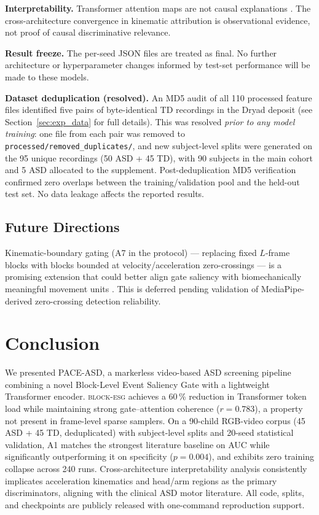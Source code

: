\documentclass[a4paper,fleqn]{cas-sc}
\newcommand{\besg}{\textsc{block-esg}\xspace}
\begin{document}
\textbf{Interpretability.}
Transformer attention maps are not causal explanations \citep{jain2019attention}.
The cross-architecture convergence in kinematic attribution is observational
evidence, not proof of causal discriminative relevance.

\textbf{Result freeze.}
The per-seed JSON files are treated as final.
No further architecture or hyperparameter changes informed by test-set
performance will be made to these models.

\textbf{Dataset deduplication (resolved).}
\label{sec:integrity}
An MD5 audit of all 110 processed feature files identified five pairs of
byte-identical TD recordings in the Dryad deposit
(see Section~\ref{sec:exp_data} for full details).
This was resolved \textit{prior to any model training}: one file from each pair
was removed to \texttt{processed/removed\_duplicates/}, and new subject-level
splits were generated on the 95 unique recordings (50 ASD + 45 TD),
with 90 subjects in the main cohort and 5 ASD allocated to the supplement.
Post-deduplication MD5 verification confirmed zero overlaps between
the training/validation pool and the held-out test set.
No data leakage affects the reported results.


\subsection{Future Directions}

Kinematic-boundary gating (A7 in the protocol) --- replacing fixed $L$-frame
blocks with blocks bounded at velocity/acceleration zero-crossings --- is a
promising extension that could better align gate saliency with biomechanically
meaningful movement units \citep{bhat2012perspectives}.
This is deferred pending validation of MediaPipe-derived zero-crossing detection
reliability.

\section{Conclusion}
\label{sec:conc}

We presented PACE-ASD, a markerless video-based ASD screening pipeline
combining a novel Block-Level Event Saliency Gate with a lightweight Transformer
encoder.
\besg achieves a 60\,\% reduction in Transformer token load while maintaining
strong gate--attention coherence ($r=0.783$), a property not present in
frame-level sparse samplers.
On a 90-child RGB-video corpus (45 ASD + 45 TD, deduplicated) with subject-level splits and 20-seed
statistical validation, A1 matches the strongest literature baseline on AUC
while significantly outperforming it on specificity ($p=0.004$), and exhibits
zero training collapse across 240 runs.
Cross-architecture interpretability analysis consistently implicates
acceleration kinematics and head/arm regions as the primary discriminators,
aligning with the clinical ASD motor literature.
All code, splits, and checkpoints are publicly released with one-command
reproduction support.
\end{document}
